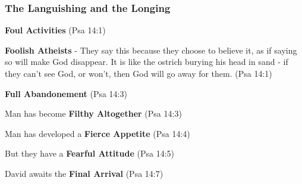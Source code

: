 \subsubsection{The Languishing and the Longing}
\begin{compactenum}[I.][9]
    \item \textbf{Foul Activities} (Psa 14:1) 
	\item\textbf{Foolish Atheists} - They say this because they choose to believe it, as if saying so will make God disappear. It is like the ostrich burying his head in sand - if they can't see God, or won't, then God will go away for them. (Psa 14:1) 
	\item  \textbf{Full Abandonement}  (Psa 14:3)
	\item Man has become \textbf{Filthy Altogether} (Psa 14:3)
	\item Man has developed a \textbf{Fierce Appetite} (Psa 14:4)
	\item But they have a \textbf{Fearful Attitude} (Psa 14:5)
    \item David awaits the \textbf{Final Arrival} (Psa 14:7)
\end{compactenum}

